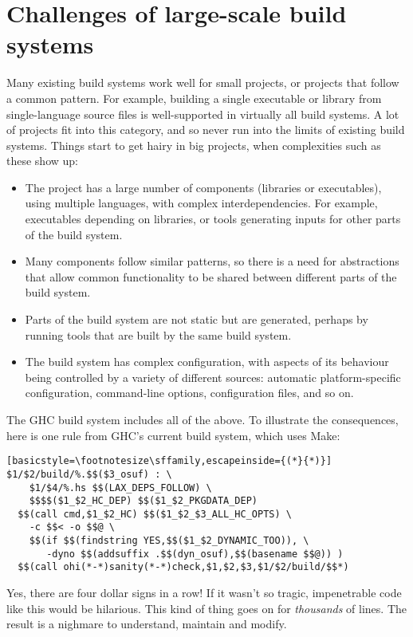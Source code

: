 \section{Challenges of large-scale build systems\label{sec:challenges}}

Many existing build systems work well for small projects, or
projects that follow a common pattern.  For example, building a single
executable or library from single-language source files is well-supported in
virtually all build systems. A lot of projects fit into this category, and so
never run into the limits of existing build systems. Things start to get hairy
in big projects, when complexities such as these show up:
\begin{itemize}
\item The project has a large number of components (libraries or
  executables), using multiple languages, with complex
  interdependencies.  For example, executables depending on libraries,
  or tools generating inputs for other parts of the build system.
\item Many components follow similar patterns, so there is a need for
  abstractions that allow common functionality to be shared between
  different parts of the build system.
\item Parts of the build system are not static but are generated,
  perhaps by running tools that are built by the same build system.
\item The build system has complex configuration, with aspects of its
  behaviour being controlled by a variety of different sources:
  automatic platform-specific configuration, command-line options,
  configuration files, and so on.
\end{itemize}
The GHC build system includes all of the above. To illustrate the
consequences, here is one rule from GHC's current build system, which
uses Make:
\begin{lstlisting}[basicstyle=\footnotesize\sffamily,escapeinside={(*}{*)}]
$1/$2/build/%.$$($3_osuf) : \
    $1/$4/%.hs $$(LAX_DEPS_FOLLOW) \
    $$$$($1_$2_HC_DEP) $$($1_$2_PKGDATA_DEP)
  $$(call cmd,$1_$2_HC) $$($1_$2_$3_ALL_HC_OPTS) \
    -c $$< -o $$@ \
    $$(if $$(findstring YES,$$($1_$2_DYNAMIC_TOO)), \
       -dyno $$(addsuffix .$$(dyn_osuf),$$(basename $$@)) )
  $$(call ohi(*-*)sanity(*-*)check,$1,$2,$3,$1/$2/build/$$*)
\end{lstlisting}
\vspace{-1mm}
Yes, there are four dollar signs in a row!  If it wasn't so tragic,
impenetrable code like this would be hilarious.  This kind of thing
goes on for \emph{thousands} of lines.  The result is a nighmare to
understand, maintain and modify.

